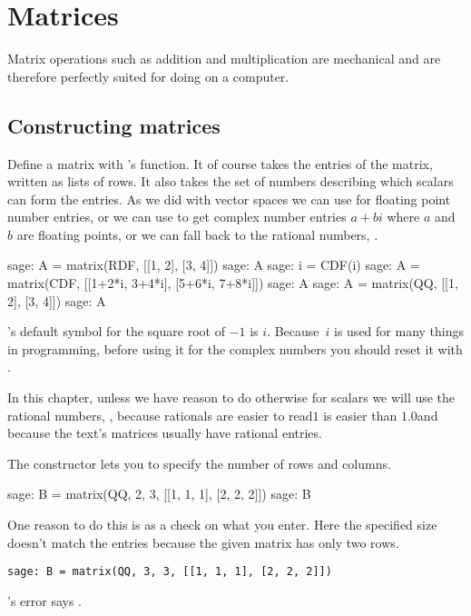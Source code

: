\chapter{Matrices}

Matrix operations such as addition and multiplication
are mechanical and are therefore perfectly suited for doing on 
a computer.



\section{Constructing matrices}
Define a matrix with \Sage's  function.
It of course takes the entries of the matrix, written as lists of rows.
It also takes the set of numbers describing which scalars can 
form the entries.
As we did with vector spaces we can use  for 
floating point number entries, 
or we can use  to get complex number entries $a+bi$ where 
$a$ and~$b$ are floating points,
or we can fall back to the rational numbers, .
\begin{sagecommandline}
sage: A = matrix(RDF, [[1, 2], [3, 4]])
sage: A
sage: i = CDF(i)
sage: A = matrix(CDF, [[1+2*i, 3+4*i], [5+6*i, 7+8*i]])
sage: A
sage: A = matrix(QQ, [[1, 2], [3, 4]])
sage: A                           
\end{sagecommandline}
\Sage's default symbol for the square root of $-1$ is $i$. 
Because~$i$ is used for many things in programming,
before using it for the complex numbers you should
reset it with .

In this chapter, unless we have reason to do otherwise
for scalars we will use the rational numbers, , 
because rationals are easier to read\Dash $1$ is easier than $1.0$\Dash and 
because the text's matrices usually have rational entries.

The  constructor lets you to specify the number of
rows and columns.
\begin{sagecommandline}
sage: B = matrix(QQ, 2, 3, [[1, 1, 1], [2, 2, 2]])  
sage: B
\end{sagecommandline}
One reason to do this is as a check on what you enter.
Here the specified size doesn't match the entries because
the given matrix has only two rows. 
\begin{lstlisting}[style=python]
sage: B = matrix(QQ, 3, 3, [[1, 1, 1], [2, 2, 2]])  
\end{lstlisting}
\Sage's error says
.

